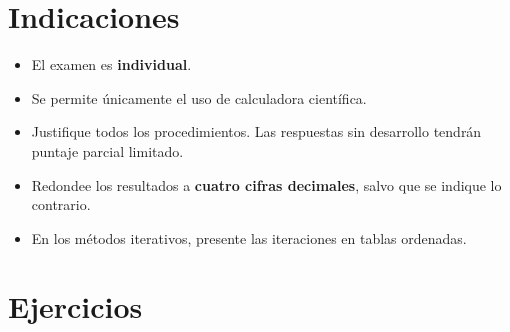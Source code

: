 \documentclass[11pt,respuestas,a4]{aleph-examen}
\begin{document}
\encabezado

\section*{Indicaciones}
\begin{itemize}
    \item El examen es \textbf{individual}.
    \item Se permite únicamente el uso de calculadora científica.
    \item Justifique todos los procedimientos. Las respuestas sin desarrollo tendrán puntaje parcial limitado.
    \item Redondee los resultados a \textbf{cuatro cifras decimales}, salvo que se indique lo contrario.
    \item En los métodos iterativos, presente las iteraciones en tablas ordenadas.
\end{itemize}

\section*{Ejercicios}
\end{document}
